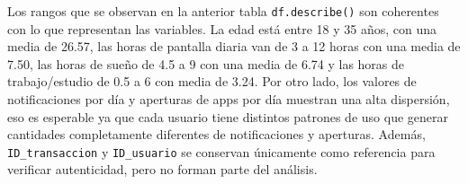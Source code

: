 \documentclass[11pt,spanish,a4paper,]{article}
\begin{document}
\begin{table}

\caption{\label{tbl-describe-num}Primeras estadísticas de las variables
numéricas (archivo original).}


\end{table}%

Los rangos que se observan en la anterior tabla \texttt{df.describe()}
son coherentes con lo que representan las variables. La edad está entre
18 y 35 años, con una media de 26.57, las horas de pantalla diaria van
de 3 a 12 horas con una media de 7.50, las horas de sueño de 4.5 a 9 con
una media de 6.74 y las horas de trabajo/estudio de 0.5 a 6 con media de
3.24. Por otro lado, los valores de notificaciones por día y aperturas
de apps por día muestran una alta dispersión, eso es esperable ya que
cada usuario tiene distintos patrones de uso que generar cantidades
completamente diferentes de notificaciones y aperturas. Además,
\texttt{ID\_transaccion} y \texttt{ID\_usuario} se conservan únicamente
como referencia para verificar autenticidad, pero no forman parte del
análisis.
\end{document}
